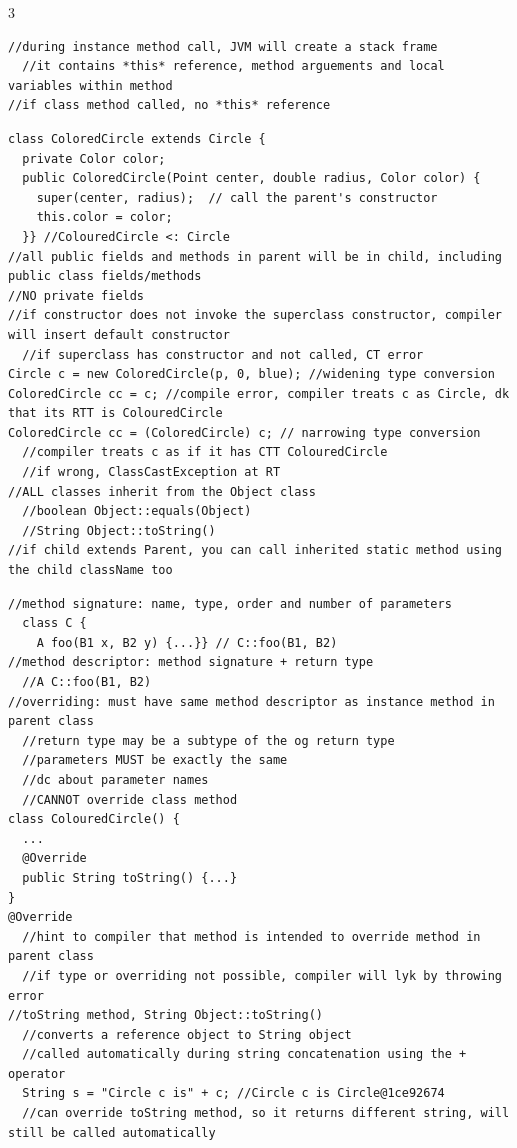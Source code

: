 \documentclass[10pt,a4paper]{article}
\begin{document}
\begin{multicols*}{3}
\begin{verbatim}
//during instance method call, JVM will create a stack frame
  //it contains *this* reference, method arguements and local variables within method
//if class method called, no *this* reference
\end{verbatim}
\begin{verbatim}
class ColoredCircle extends Circle {
  private Color color;
  public ColoredCircle(Point center, double radius, Color color) {
    super(center, radius);  // call the parent's constructor
    this.color = color;
  }} //ColouredCircle <: Circle
//all public fields and methods in parent will be in child, including public class fields/methods
//NO private fields
//if constructor does not invoke the superclass constructor, compiler will insert default constructor
  //if superclass has constructor and not called, CT error
Circle c = new ColoredCircle(p, 0, blue); //widening type conversion
ColoredCircle cc = c; //compile error, compiler treats c as Circle, dk that its RTT is ColouredCircle
ColoredCircle cc = (ColoredCircle) c; // narrowing type conversion
  //compiler treats c as if it has CTT ColouredCircle
  //if wrong, ClassCastException at RT
//ALL classes inherit from the Object class
  //boolean Object::equals(Object)
  //String Object::toString()
//if child extends Parent, you can call inherited static method using the child className too
\end{verbatim}
\begin{verbatim}
//method signature: name, type, order and number of parameters
  class C {
    A foo(B1 x, B2 y) {...}} // C::foo(B1, B2)
//method descriptor: method signature + return type
  //A C::foo(B1, B2)
//overriding: must have same method descriptor as instance method in parent class
  //return type may be a subtype of the og return type
  //parameters MUST be exactly the same
  //dc about parameter names
  //CANNOT override class method
class ColouredCircle() {
  ...
  @Override
  public String toString() {...}
}
@Override
  //hint to compiler that method is intended to override method in parent class
  //if type or overriding not possible, compiler will lyk by throwing error
//toString method, String Object::toString()
  //converts a reference object to String object
  //called automatically during string concatenation using the + operator
  String s = "Circle c is" + c; //Circle c is Circle@1ce92674
  //can override toString method, so it returns different string, will still be called automatically

\end{verbatim}
\end{multicols*}
\end{document}
